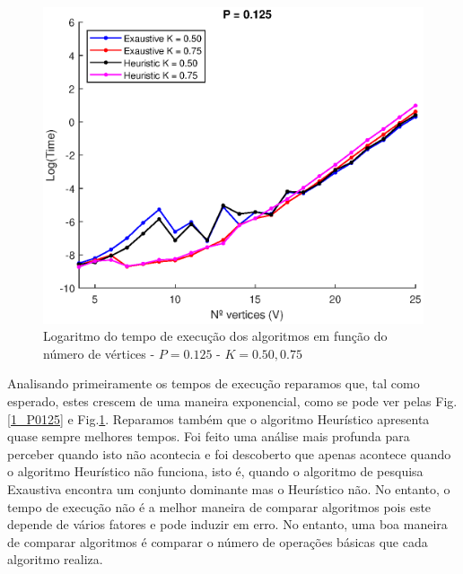 \documentclass{revdetua}
\begin{document}
\begin{figure}[h!]
\centering
\includegraphics[scale = 0.5]{Figs/2_P0125.eps}
\caption{Logaritmo do tempo de execução dos algoritmos em função do número de vértices - $P = 0.125$ - $K = 0.50, 0.75$}
\label{2_P0125}
\end{figure}

Analisando primeiramente os tempos de execução reparamos que, tal como esperado, estes crescem de uma maneira exponencial, como se pode ver pelas Fig.\ref{1_P0125} e Fig.\ref{2_P0125}. Reparamos também que o algoritmo Heurístico apresenta quase sempre melhores tempos. Foi feito uma análise mais profunda para perceber quando isto não acontecia e foi descoberto que apenas acontece quando o algoritmo Heurístico não funciona, isto é, quando o algoritmo de pesquisa Exaustiva encontra um conjunto dominante mas o Heurístico não.
No entanto, o tempo de execução não é a melhor maneira de comparar algoritmos pois este depende de vários fatores e pode induzir em erro. No entanto, uma boa maneira de comparar algoritmos é comparar o número de operações básicas que cada algoritmo realiza. 
\end{document}
